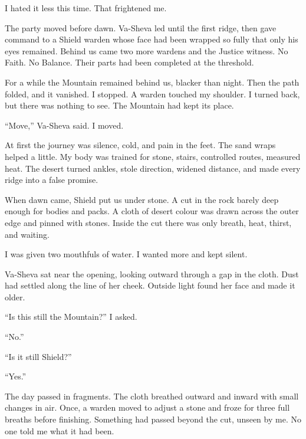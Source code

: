I hated it less this time. That frightened me.\par

The party moved before dawn. Va-Sheva led until the first ridge, then gave command to a Shield warden whose face had been wrapped so fully that only his eyes remained. Behind us came two more wardens and the Justice witness. No Faith. No Balance. Their parts had been completed at the threshold.\par

For a while the Mountain remained behind us, blacker than night. Then the path folded, and it vanished. I stopped. A warden touched my shoulder. I turned back, but there was nothing to see. The Mountain had kept its place.\par

``Move,'' Va-Sheva said. I moved.\par

At first the journey was silence, cold, and pain in the feet. The sand wraps helped a little. My body was trained for stone, stairs, controlled routes, measured heat. The desert turned ankles, stole direction, widened distance, and made every ridge into a false promise.\par

When dawn came, Shield put us under stone. A cut in the rock barely deep enough for bodies and packs. A cloth of desert colour was drawn across the outer edge and pinned with stones. Inside the cut there was only breath, heat, thirst, and waiting.\par

I was given two mouthfuls of water. I wanted more and kept silent.\par

Va-Sheva sat near the opening, looking outward through a gap in the cloth. Dust had settled along the line of her cheek. Outside light found her face and made it older.\par

``Is this still the Mountain?'' I asked.\par

``No.''\par

``Is it still Shield?''\par

``Yes.''\par

The day passed in fragments. The cloth breathed outward and inward with small changes in air. Once, a warden moved to adjust a stone and froze for three full breaths before finishing. Something had passed beyond the cut, unseen by me. No one told me what it had been.\par

